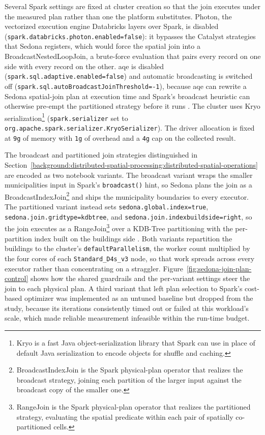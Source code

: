 Several Spark settings are fixed at cluster creation so that the join executes under the measured plan rather than one the platform substitutes. Photon, the vectorized execution engine Databricks layers over Spark, is disabled (\texttt{spark.databricks.photon.enabled=false}): it bypasses the Catalyst strategies that Sedona registers, which would force the spatial join into a BroadcastNestedLoopJoin, a brute-force evaluation that pairs every record on one side with every record on the other. \acrfull{aqe} is disabled (\texttt{spark.sql.adaptive.enabled=false}) and automatic broadcasting is switched off (\texttt{spark.sql.autoBroadcastJoinThreshold=-1}), because \acrshort{aqe} can rewrite a Sedona spatial-join plan at execution time and Spark's broadcast heuristic can otherwise pre-empt the partitioned strategy before it runs \parencite{spark2024_sql_performance_tuning}. The cluster uses Kryo serialization\footnote{Kryo is a fast Java object-serialization library that Spark can use in place of default Java serialization to encode objects for shuffle and caching.} (\texttt{spark.serializer} set to \texttt{org.apache.spark.serializer.KryoSerializer}). The driver allocation is fixed at \texttt{9g} of memory with \texttt{1g} of overhead and a \texttt{4g} cap on the collected result.

The broadcast and partitioned join strategies distinguished in Section~\ref{background:distributed-spatial-processing:distributed-spatial-operations} are encoded as two notebook variants. The broadcast variant wraps the smaller municipalities input in Spark's \texttt{broadcast()} hint, so Sedona plans the join as a BroadcastIndexJoin\footnote{BroadcastIndexJoin is the Spark physical-plan operator that realizes the broadcast strategy, joining each partition of the larger input against the broadcast copy of the smaller one.} and ships the municipality boundaries to every executor. The partitioned variant instead sets \texttt{sedona.global.index=true}, \texttt{sedona.join.gridtype=\allowbreak kdbtree}, and \texttt{sedona.join.indexbuildside=right}, so the join executes as a RangeJoin\footnote{RangeJoin is the Spark physical-plan operator that realizes the partitioned strategy, evaluating the spatial predicate within each pair of spatially co-partitioned cells.} over a KDB-Tree partitioning with the per-partition index built on the buildings side \parencite{sedona2024_spatial_sql_application}. Both variants repartition the buildings to the cluster's \texttt{defaultParallelism}, the worker count multiplied by the four cores of each \texttt{Standard\_D4s\_v3} node, so that work spreads across every executor rather than concentrating on a straggler. Figure~\ref{fig:sedona-join-plan-control} shows how the shared guardrails and the per-variant settings steer the join to each physical plan. A third variant that left plan selection to Spark's cost-based optimizer was implemented as an untuned baseline but dropped from the study, because its iterations consistently timed out or failed at this workload's scale, which made reliable measurement infeasible within the run-time budget.

